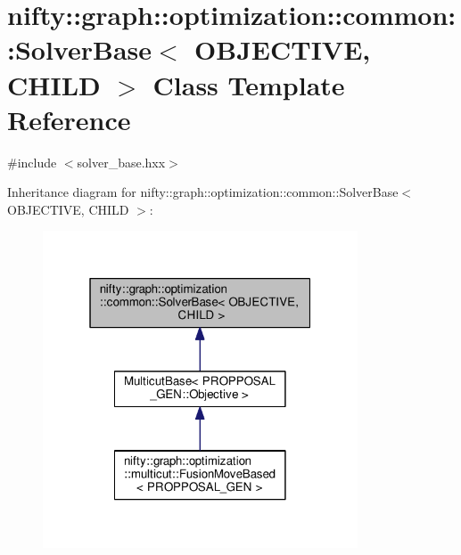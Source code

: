 \hypertarget{classnifty_1_1graph_1_1optimization_1_1common_1_1SolverBase}{}\section{nifty\+:\+:graph\+:\+:optimization\+:\+:common\+:\+:Solver\+Base$<$ O\+B\+J\+E\+C\+T\+I\+V\+E, C\+H\+I\+L\+D $>$ Class Template Reference}
\label{classnifty_1_1graph_1_1optimization_1_1common_1_1SolverBase}


{\ttfamily \#include $<$solver\+\_\+base.\+hxx$>$}



Inheritance diagram for nifty\+:\+:graph\+:\+:optimization\+:\+:common\+:\+:Solver\+Base$<$ O\+B\+J\+E\+C\+T\+I\+V\+E, C\+H\+I\+L\+D $>$\+:\nopagebreak
\begin{figure}[H]
\begin{center}
\leavevmode
\includegraphics[width=265pt]{classnifty_1_1graph_1_1optimization_1_1common_1_1SolverBase__inherit__graph}
\end{center}
\end{figure}
